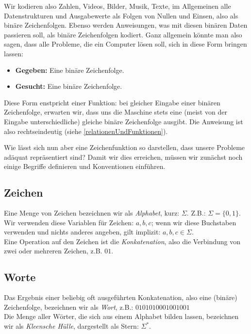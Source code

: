 Wir kodieren also Zahlen, Videos, Bilder, Musik, Texte, im Allgemeinen alle Datenstrukturen
und Ausgabewerte als Folgen von Nullen und Einsen,
also als binäre Zeichenfolgen. 
Ebenso werden Anweisungen, was mit diesen binären Daten passieren soll,
als binäre Zeichenfolgen kodiert.
Ganz allgemein könnte man also sagen, dass alle Probleme, die ein Computer lösen soll,
sich in diese Form bringen lassen:
\begin{itemize}
    \item \textbf{Gegeben:} Eine binäre Zeichenfolge.
    \item \textbf{Gesucht:} Eine binäre Zeichenfolge.
\end{itemize}

Diese Form enstpricht einer Funktion:
bei gleicher Eingabe einer binären Zeichenfolge,
erwarten wir, dass uns die Maschine stets eine (meist von der Eingabe unterschiedliche)
gleiche binäre Zeichenfolge ausgibt.
Die Anweisung ist also rechtseindeutig (siehe \autoref{relationenUndFunktionen}).

Wie lässt sich nun aber eine Zeichenfunktion so darstellen,
dass unsere Probleme adäquat repräsentiert sind?
Damit wir dies erreichen, 
müssen wir zunächst noch einige Begriffe definieren und Konventionen einführen.

\subsection{Zeichen}

Eine Menge von Zeichen bezeichnen wir als \emph{Alphabet}, kurz: $\Sigma$.
Z.B.: $\Sigma = \{0,1\}$.\\

\noindent
Wir verwenden diese Variablen für Zeichen: $a,b,c$;
wenn wir diese Buchstaben verwenden und nichts anderes angeben,
gilt implizit: $a, b, c \in \Sigma$.\\

\noindent
Eine Operation auf den Zeichen ist die \emph{Konkatenation},
also die Verbindung von zwei oder mehreren Zeichen, z.B. $01$.

\subsection{Worte}
Das Ergebnis einer beliebig oft ausgeführten Konkatenation,
also eine (binäre) Zeichenfolge,
bezeichnen wir als \emph{Wort}, z.B.: $0101010001001001$\\

\noindent
Die Menge aller Wörter,
die sich aus einem Alphabet bilden lassen,
bezeichnen wir als \emph{Kleensche Hülle}, dargestellt als Stern: $\Sigma^*$.\\

